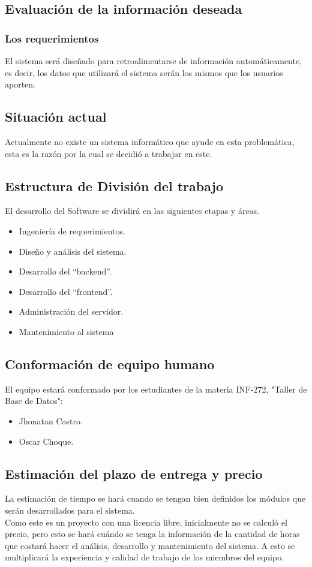 \documentclass[letterpaper]{article}
\begin{document}
\subsection{Evaluación de la información deseada }
\subsubsection*{Los requerimientos}
El sistema será diseñado para retroalimentarse de información
automáticamente, es decir, los datos que utilizará el sistema serán los mismos
que los usuarios aporten.
\subsection{Situación actual}
Actualmente no existe un sistema informático que ayude en esta
problemática, esta es la razón por la cual se decidió a trabajar en este.
\subsection{Estructura de División del trabajo}
El desarrollo del Software se dividirá en las siguientes etapas y áreas.
\begin{itemize}
\item Ingeniería de requerimientos.
\item Diseño y análisis del sistema.
\item Desarrollo del “backend”.
\item Desarrollo del “frontend”.
\item Administración del servidor.
\item Mantenimiento al sistema
\end{itemize}
\subsection{Conformación de equipo humano}
El equipo estará conformado por los estudiantes de la materia INF-272, "Taller de Base de Datos":
\begin{itemize}
\item Jhonatan Castro.
\item Oscar Choque.
\end{itemize}
\subsection{Estimación del plazo de entrega y precio}
La estimación de tiempo se hará cuando se tengan bien definidos los
módulos que serán desarrollados para el sistema.
\\
Como este es un proyecto con una licencia libre, inicialmente no se
calculó el precio, pero esto se hará cuándo se tenga la información de la cantidad de horas que costará hacer el análisis, desarrollo y mantenimiento del sistema. A esto se multiplicará la experiencia y calidad de trabajo de los miembros del equipo.
\end{document}
